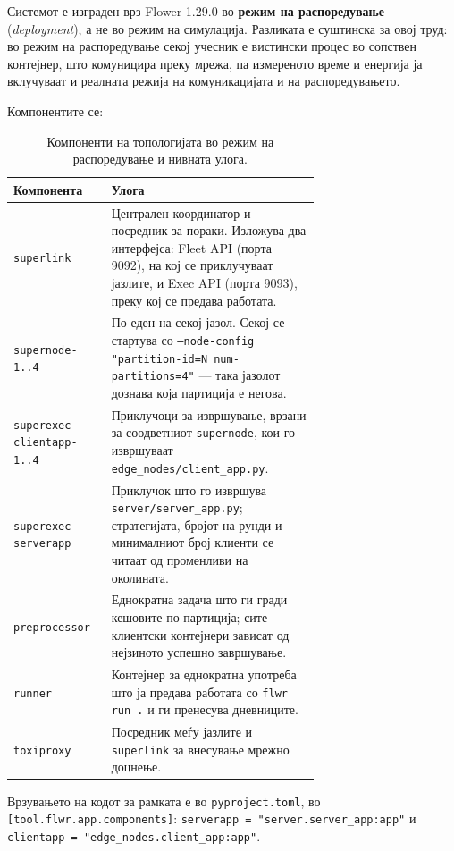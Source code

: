 Системот е изграден врз Flower 1.29.0 \cite{beutel2020flower} во \textbf{режим на распоредување}
(\emph{deployment}), а не во режим на симулација. Разликата е суштинска за овој труд: во режим на
распоредување секој учесник е вистински процес во сопствен контејнер, што комуницира преку
мрежа, па измереното време и енергија ја вклучуваат и реалната режија на комуникацијата и
на распоредувањето.

Компонентите се:

\begin{table}[htbp]
\centering
\caption{Компоненти на топологијата во режим на распоредување и нивната улога.}
\label{tab:topology-components}
\begin{tabular}{lp{0.68\linewidth}}
\toprule
Компонента & Улога \\
\midrule
\texttt{superlink} & Централен координатор и посредник за пораки. Изложува два интерфејса: Fleet API (порта 9092), на кој се приклучуваат јазлите, и Exec API (порта 9093), преку кој се предава работата. \\
\texttt{supernode-1..4} & По еден на секој јазол. Секој се стартува со \texttt{--node-config "partition-id=N num-partitions=4"} --- така јазолот дознава која партиција е негова. \\
\texttt{superexec-clientapp-1..4} & Приклучоци за извршување, врзани за соодветниот \texttt{supernode}, кои го извршуваат \texttt{edge\_nodes/client\_app.py}. \\
\texttt{superexec-serverapp} & Приклучок што го извршува \texttt{server/server\_app.py}; стратегијата, бројот на рунди и минималниот број клиенти се читаат од променливи на околината. \\
\texttt{preprocessor} & Еднократна задача што ги гради кешовите по партиција; сите клиентски контејнери зависат од нејзиното успешно завршување. \\
\texttt{runner} & Контејнер за еднократна употреба што ја предава работата со \texttt{flwr run .} и ги пренесува дневниците. \\
\texttt{toxiproxy} & Посредник меѓу јазлите и \texttt{superlink} за внесување мрежно доцнење. \\
\bottomrule
\end{tabular}
\end{table}

Врзувањето на кодот за рамката е во \texttt{pyproject.toml}, во \texttt{[tool.flwr.app.components]}:
\texttt{serverapp = "server.server\_app:app"} и \texttt{clientapp = "edge\_nodes.client\_app:app"}.

